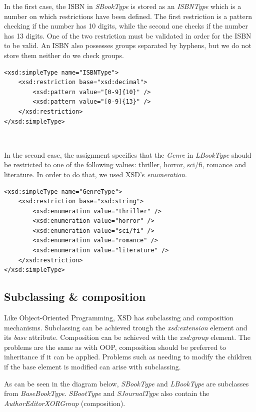 In the first case, the ISBN in \emph{SBookType} is stored as an \emph{ISBNType}
which is a number on which restrictions have been defined. The first restriction
is a pattern checking if the number has 10 digits, while the second one checks
if the number has 13 digits. One of the two restriction must be validated in
order for the ISBN to be valid. An ISBN also possesses groups separated by
hyphens, but we do not store them neither do we check groups.
\begin{lstlisting}
<xsd:simpleType name="ISBNType">
    <xsd:restriction base="xsd:decimal">
        <xsd:pattern value="[0-9]{10}" />
        <xsd:pattern value="[0-9]{13}" />
    </xsd:restriction>
</xsd:simpleType>
\end{lstlisting}
\

In the second case, the assignment specifies that the \emph{Genre} in
\emph{LBookType} should be restricted to one of the following values: thriller,
horror, sci/fi, romance and literature. In order to do that, we used XSD's
\emph{enumeration}.
\begin{lstlisting}
<xsd:simpleType name="GenreType">
    <xsd:restriction base="xsd:string">
        <xsd:enumeration value="thriller" />
        <xsd:enumeration value="horror" />
        <xsd:enumeration value="sci/fi" />
        <xsd:enumeration value="romance" />
        <xsd:enumeration value="literature" />
    </xsd:restriction>
</xsd:simpleType>
\end{lstlisting}

\subsection{Subclassing \& composition}

Like Object-Oriented Programming, XSD has subclassing and composition mechanisms.
Subclassing can be achieved trough the \emph{xsd:extension} element and its
\emph{base} attribute. Composition can be achieved with the \emph{xsd:group}
element. The problems are the same as with OOP, composition should be preferred
to inheritance if it can be applied. Problems such as needing to modify the
children if the base element is modified can arise with subclassing.
\newpage

As can be seen in the diagram below, \emph{SBookType} and \emph{LBookType} are
subclasses from \emph{BaseBookType}. \emph{SBootType} and \emph{SJournalType}
also contain the \emph{AuthorEditorXORGroup} (composition).\\

